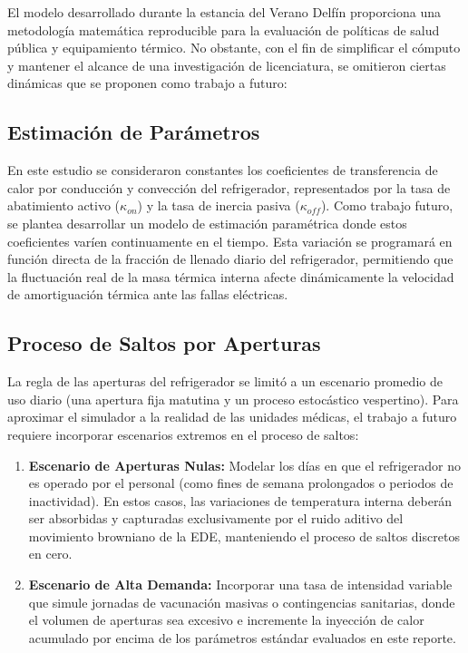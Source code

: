 \documentclass[
  spanish,
  letterpaper,
  DIV=11,
  numbers=noendperiod]{scrreprt}
\providecommand{\tightlist}{%
  \setlength{\itemsep}{0pt}\setlength{\parskip}{0pt}}
\theoremstyle{plain}
\theoremstyle{definition}
\theoremstyle{remark}
\begin{document}
El modelo desarrollado durante la estancia del Verano Delfín proporciona
una metodología matemática reproducible para la evaluación de políticas
de salud pública y equipamiento térmico. No obstante, con el fin de
simplificar el cómputo y mantener el alcance de una investigación de
licenciatura, se omitieron ciertas dinámicas que se proponen como
trabajo a futuro:

\subsection{Estimación de
Parámetros}\label{estimaciuxf3n-de-paruxe1metros}

En este estudio se consideraron constantes los coeficientes de
transferencia de calor por conducción y convección del refrigerador,
representados por la tasa de abatimiento activo (\(\kappa_{on}\)) y la
tasa de inercia pasiva (\(\kappa_{off}\)). Como trabajo futuro, se
plantea desarrollar un modelo de estimación paramétrica donde estos
coeficientes varíen continuamente en el tiempo. Esta variación se
programará en función directa de la fracción de llenado diario del
refrigerador, permitiendo que la fluctuación real de la masa térmica
interna afecte dinámicamente la velocidad de amortiguación térmica ante
las fallas eléctricas.

\subsection{Proceso de Saltos por
Aperturas}\label{proceso-de-saltos-por-aperturas}

La regla de las aperturas del refrigerador se limitó a un escenario
promedio de uso diario (una apertura fija matutina y un proceso
estocástico vespertino). Para aproximar el simulador a la realidad de
las unidades médicas, el trabajo a futuro requiere incorporar escenarios
extremos en el proceso de saltos:

\begin{enumerate}
\def\labelenumi{\arabic{enumi}.}
\tightlist
\item
  \textbf{Escenario de Aperturas Nulas:} Modelar los días en que el
  refrigerador no es operado por el personal (como fines de semana
  prolongados o periodos de inactividad). En estos casos, las
  variaciones de temperatura interna deberán ser absorbidas y capturadas
  exclusivamente por el ruido aditivo del movimiento browniano de la
  EDE, manteniendo el proceso de saltos discretos en cero.
\item
  \textbf{Escenario de Alta Demanda:} Incorporar una tasa de intensidad
  variable que simule jornadas de vacunación masivas o contingencias
  sanitarias, donde el volumen de aperturas sea excesivo e incremente la
  inyección de calor acumulado por encima de los parámetros estándar
  evaluados en este reporte.
\end{enumerate}
\end{document}
